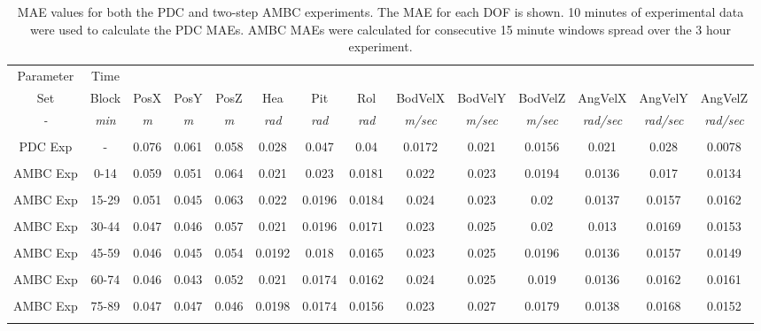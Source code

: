 \begin{table}
\ssp
\fontsize{10pt}{10pt}\selectfont
\caption{\acf{MAE} values for both the \ac{PDC} and two-step \ac{AMBC}
  experiments.  The \ac{MAE} for each \ac{DOF} is shown. 10 minutes of
  experimental data were used to calculate the \ac{PDC} \acp{MAE}.
  \ac{AMBC} \acp{MAE} were calculated for consecutive 15 minute
  windows spread over the 3 hour experiment.}
\begin{center}
\begin{tabular}{c|ccccccccccccc} 
    Parameter & Time  &&&&&&&&&&&& \\              
          Set & Block & PosX & PosY & PosZ & Hea & Pit & Rol & BodVelX & BodVelY & BodVelZ & AngVelX & AngVelY & AngVelZ \\  
      {\it -} & {\it min} & {\it m}   &  {\it m}  &  {\it m}  &{\it rad} &{\it rad} &{\it rad} &{\it m/sec} &{\it m/sec} &{\it m/sec} &{\it rad/sec} &{\it rad/sec} &{\it rad/sec} \\ \hline 
\\
\ac{PDC} Exp  &    -   & 0.076  & 0.061  & 0.058  & 0.028  & 0.047  & 0.04  & 0.0172  & 0.021  & 0.0156  & 0.021  & 0.028  & 0.0078  \\ \hline
\\
\ac{AMBC} Exp & 0-14   & 0.059  & 0.051  & 0.064  & 0.021  & 0.023  & 0.0181  & 0.022  & 0.023  & 0.0194  & 0.0136  & 0.017  & 0.0134  \\
\\
\ac{AMBC} Exp & 15-29   & 0.051  & 0.045  & 0.063  & 0.022  & 0.0196  & 0.0184  & 0.024  & 0.023  & 0.02  & 0.0137  & 0.0157  & 0.0162  \\
\\
\ac{AMBC} Exp & 30-44   & 0.047  & 0.046  & 0.057  & 0.021  & 0.0196  & 0.0171  & 0.023  & 0.025  & 0.02  & 0.013  & 0.0169  & 0.0153  \\
\\
\ac{AMBC} Exp & 45-59   & 0.046  & 0.045  & 0.054  & 0.0192  & 0.018  & 0.0165  & 0.023  & 0.025  & 0.0196  & 0.0136  & 0.0157  & 0.0149  \\
\\
\ac{AMBC} Exp & 60-74   & 0.046  & 0.043  & 0.052  & 0.021  & 0.0174  & 0.0162  & 0.024  & 0.025  & 0.019  & 0.0136  & 0.0162  & 0.0161  \\
\\
\ac{AMBC} Exp & 75-89   & 0.047  & 0.047  & 0.046  & 0.0198  & 0.0174  & 0.0156  & 0.023  & 0.027  & 0.0179  & 0.0138  & 0.0168  & 0.0152  \\
\\

\end{tabular}
\end{center}
\end{table}
